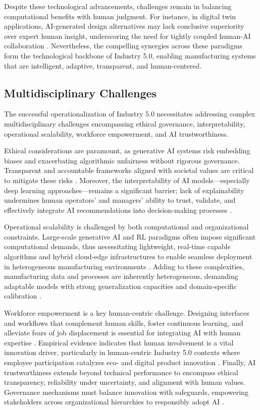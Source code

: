 \documentclass[sigconf]{acmart}
\begin{document}
Despite these technological advancements, challenges remain in balancing computational benefits with human judgment. For instance, in digital twin applications, AI-generated design alternatives may lack conclusive superiority over expert human insight, underscoring the need for tightly coupled human-AI collaboration \cite{ref2}. Nevertheless, the compelling synergies across these paradigms form the technological backbone of Industry 5.0, enabling manufacturing systems that are intelligent, adaptive, transparent, and human-centered.

\subsection{Multidisciplinary Challenges}

The successful operationalization of Industry 5.0 necessitates addressing complex multidisciplinary challenges encompassing ethical governance, interpretability, operational scalability, workforce empowerment, and AI trustworthiness.

Ethical considerations are paramount, as generative AI systems risk embedding biases and exacerbating algorithmic unfairness without rigorous governance. Transparent and accountable frameworks aligned with societal values are critical to mitigate these risks \cite{ref2,ref41}. Moreover, the interpretability of AI models—especially deep learning approaches—remains a significant barrier; lack of explainability undermines human operators’ and managers’ ability to trust, validate, and effectively integrate AI recommendations into decision-making processes \cite{ref30}.

Operational scalability is challenged by both computational and organizational constraints. Large-scale generative AI and RL paradigms often impose significant computational demands, thus necessitating lightweight, real-time capable algorithms and hybrid cloud-edge infrastructures to enable seamless deployment in heterogeneous manufacturing environments \cite{ref19,ref37}. Adding to these complexities, manufacturing data and processes are inherently heterogeneous, demanding adaptable models with strong generalization capacities and domain-specific calibration \cite{ref7,ref29}.

Workforce empowerment is a key human-centric challenge. Designing interfaces and workflows that complement human skills, foster continuous learning, and alleviate fears of job displacement is essential for integrating AI with human expertise \cite{ref2,ref22}. Empirical evidence indicates that human involvement is a vital innovation driver, particularly in human-centric Industry 5.0 contexts where employee participation catalyzes eco- and digital product innovation \cite{ref22}. Finally, AI trustworthiness extends beyond technical performance to encompass ethical transparency, reliability under uncertainty, and alignment with human values. Governance mechanisms must balance innovation with safeguards, empowering stakeholders across organizational hierarchies to responsibly adopt AI \cite{ref41}.
\end{document}
